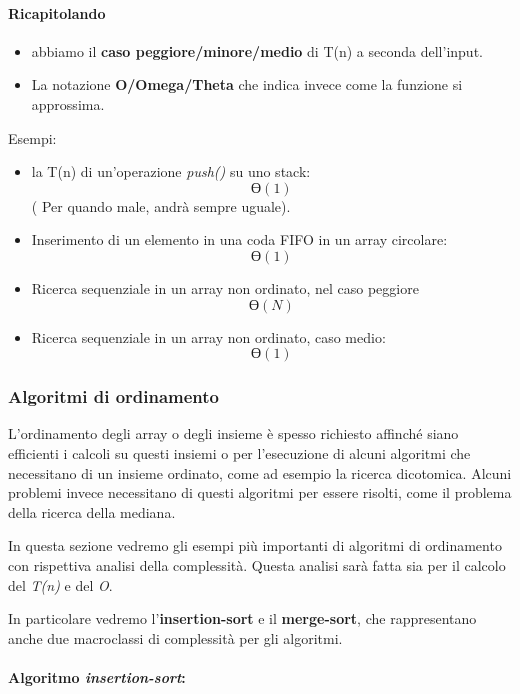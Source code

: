 \documentclass[
  paper=a4,
  oneside  ,captions=tableheading
]{scrbook}
\providecommand{\tightlist}{%
  \setlength{\itemsep}{0pt}\setlength{\parskip}{0pt}}
\begin{document}
\hypertarget{ricapitolando}{%
\paragraph{Ricapitolando}\label{ricapitolando}}

\begin{itemize}
\tightlist
\item
  abbiamo il \textbf{caso peggiore/minore/medio} di T(n) a seconda
  dell'input.
\item
  La notazione \textbf{O/Omega/Theta} che indica invece come la funzione
  si approssima.
\end{itemize}

Esempi:

\begin{itemize}
\item
  la T(n) di un'operazione \emph{push()} su uno stack: \[
  Ɵ(1)
  \] ( Per quando male, andrà sempre uguale).
\item
  Inserimento di un elemento in una coda FIFO in un array circolare: \[
  Ɵ(1)
  \]
\item
  Ricerca sequenziale in un array non ordinato, nel caso peggiore \[
  Ɵ(N)
  \]
\item
  Ricerca sequenziale in un array non ordinato, caso medio: \[
  Ɵ(1)
  \]
\end{itemize}

\hypertarget{algoritmi-di-ordinamento}{%
\subsubsection{Algoritmi di
ordinamento}\label{algoritmi-di-ordinamento}}

L'ordinamento degli array o degli insieme è spesso richiesto affinché
siano efficienti i calcoli su questi insiemi o per l'esecuzione di
alcuni algoritmi che necessitano di un insieme ordinato, come ad esempio
la ricerca dicotomica. Alcuni problemi invece necessitano di questi
algoritmi per essere risolti, come il problema della ricerca della
mediana.

In questa sezione vedremo gli esempi più importanti di algoritmi di
ordinamento con rispettiva analisi della complessità. Questa analisi
sarà fatta sia per il calcolo del \emph{T(n)} e del \emph{O}.

In particolare vedremo l'\textbf{insertion-sort} e il
\textbf{merge-sort}, che rappresentano anche due macroclassi di
complessità per gli algoritmi.

\hypertarget{algoritmo-insertion-sort}{%
\paragraph{\texorpdfstring{Algoritmo
\emph{insertion-sort}:}{Algoritmo insertion-sort:}}\label{algoritmo-insertion-sort}}
\end{document}
